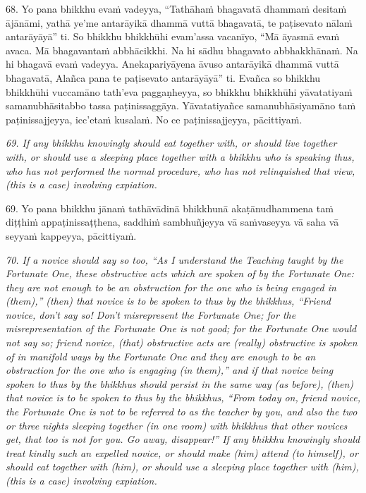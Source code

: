 \documentclass[11pt]{article}
\begin{document}
\begin{paracol}{2}
\begin{column}
\begin{flushleft}
68. Yo pana bhikkhu evaṁ vadeyya, “Tathāhaṁ bhagavatā dhammaṁ desitaṁ ājānāmi, yathā ye’me antarāyikā dhammā vuttā bhagavatā, te paṭisevato nālaṁ antarāyāyā” ti. So bhikkhu bhikkhūhi evam’assa vacanīyo, “Mā āyasmā evaṁ avaca. Mā bhagavantaṁ abbhācikkhi. Na hi sādhu bhagavato abbhakkhānaṁ. Na hi bhagavā evaṁ vadeyya. Anekapariyāyena āvuso antarāyikā dhammā vuttā bhagavatā, Alañca pana te paṭisevato antarāyāyā” ti. Evañca so bhikkhu bhikkhūhi vuccamāno tath’eva paggaṇheyya, so bhikkhu bhikkhūhi yāvatatiyaṁ samanubhāsitabbo tassa paṭinissaggāya. Yāvatatiyañce samanubhāsiyamāno taṁ paṭinissajjeyya, icc’etaṁ kusalaṁ. No ce paṭinissajjeyya, pācittiyaṁ.
\switchcolumn*
\end{flushleft}

{\itshape\footnotesize
69. If any bhikkhu knowingly should eat together with, or should live together with, or should use a sleeping place together with a bhikkhu who is speaking thus, who has not performed the normal procedure, who has not relinquished that view, (this is a case) involving expiation.
}
\switchcolumn

\begin{flushleft}
69. Yo pana bhikkhu jānaṁ tathāvādinā bhikkhunā akaṭānudhammena taṁ diṭṭhiṁ appaṭinissaṭṭhena, saddhiṁ sambhuñjeyya vā saṁvaseyya vā saha vā seyyaṁ kappeyya, pācittiyaṁ.
\switchcolumn*
\end{flushleft}

{\itshape\footnotesize
70. If a novice should say so too, “As I understand the Teaching taught by the Fortunate One, these obstructive acts which are spoken of by the Fortunate One: they are not enough to be an obstruction for the one who is being engaged in (them),” (then) that novice is to be spoken to thus by the bhikkhus, “Friend novice, don't say so! Don't misrepresent the Fortunate One; for the misrepresentation of the Fortunate One is not good; for the Fortunate One would not say so; friend novice, (that) obstructive acts are (really) obstructive is spoken of in manifold ways by the Fortunate One and they are enough to be an obstruction for the one who is engaging (in them),” and if that novice being spoken to thus by the bhikkhus should persist in the same way (as before), (then) that novice is to be spoken to thus by the bhikkhus, “From today on, friend novice, the Fortunate One is not to be referred to as the teacher by you, and also the two or three nights sleeping together (in one room) with bhikkhus that other novices get, that too is not for you. Go away, disappear!” If any bhikkhu knowingly should treat kindly such an expelled novice, or should make (him) attend (to himself), or should eat together with (him), or should use a sleeping place together with (him), (this is a case) involving expiation.
}
\switchcolumn


\end{column}
\end{paracol}
\end{document}
